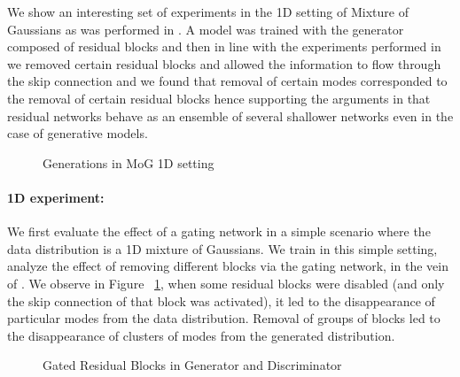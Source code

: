 We show an interesting set of experiments in the 1D setting of Mixture of Gaussians as was performed in \cite{ghosh2017multi}. A model was trained with the generator composed of residual blocks and then in line with the experiments performed in \cite{veit2016residual} we removed certain residual blocks and allowed the information to flow through the skip connection and we found that removal of certain modes corresponded to the removal of certain residual blocks hence supporting the arguments in \cite{veit2016residual} that residual networks behave as an ensemble of several shallower networks even in the case of generative models.


\begin{figure}[t]
    \centering
    \caption{Generations in MoG 1D setting}
    \label{fig:onedexperiment}
    \vspace{-3mm}
\end{figure}
\paragraph{1D experiment:}
We first evaluate the effect of a gating network in a simple scenario where the data distribution is a 1D mixture of Gaussians. 
We train \model{} in this simple setting, analyze the effect of removing different blocks via the gating network, in the vein of \cite{veit2016residual}.
We observe in Figure ~\ref{fig:onedexperiment}, when some residual blocks were disabled (and only the skip connection of that block was activated), it led to the disappearance of particular modes from the data distribution. 
Removal of groups of blocks led to the disappearance of clusters of modes from the generated distribution. 

\begin{figure*}%
    \centering
    \caption{Gated Residual Blocks in Generator and Discriminator}
    \label{fig:model}
    \vspace{-3mm}
\end{figure*}


